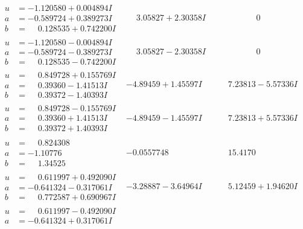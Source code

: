 \documentclass[1p]{elsarticle_modified}
\theoremstyle{definition}
\begin{document}
$$\begin{array}{c|c|c}
\begin{aligned}
u &= -1.120580 + 0.004894 I \\
a &= -0.589724 + 0.389273 I \\
b &= \phantom{-}0.128535 + 0.742200 I\end{aligned}
 & \phantom{-}3.05827 + 2.30358 I & \phantom{-0.000000 } 0 \\ \hline\begin{aligned}
u &= -1.120580 - 0.004894 I \\
a &= -0.589724 - 0.389273 I \\
b &= \phantom{-}0.128535 - 0.742200 I\end{aligned}
 & \phantom{-}3.05827 - 2.30358 I & \phantom{-0.000000 } 0 \\ \hline\begin{aligned}
u &= \phantom{-}0.849728 + 0.155769 I \\
a &= \phantom{-}0.39360 - 1.41513 I \\
b &= \phantom{-}0.39372 - 1.40393 I\end{aligned}
 & -4.89459 + 1.45597 I & \phantom{-}7.23813 - 5.57336 I \\ \hline\begin{aligned}
u &= \phantom{-}0.849728 - 0.155769 I \\
a &= \phantom{-}0.39360 + 1.41513 I \\
b &= \phantom{-}0.39372 + 1.40393 I\end{aligned}
 & -4.89459 - 1.45597 I & \phantom{-}7.23813 + 5.57336 I \\ \hline\begin{aligned}
u &= \phantom{-}0.824308\phantom{ +0.000000I} \\
a &= -1.10776\phantom{ +0.000000I} \\
b &= \phantom{-}1.34525\phantom{ +0.000000I}\end{aligned}
 & -0.0557748\phantom{ +0.000000I} & \phantom{-}15.4170\phantom{ +0.000000I} \\ \hline\begin{aligned}
u &= \phantom{-}0.611997 + 0.492090 I \\
a &= -0.641324 - 0.317061 I \\
b &= \phantom{-}0.772587 + 0.690967 I\end{aligned}
 & -3.28887 - 3.64964 I & \phantom{-}5.12459 + 1.94620 I \\ \hline\begin{aligned}
u &= \phantom{-}0.611997 - 0.492090 I \\
a &= -0.641324 + 0.317061 I \\

\end{aligned}
\end{array}$$
\end{document}
